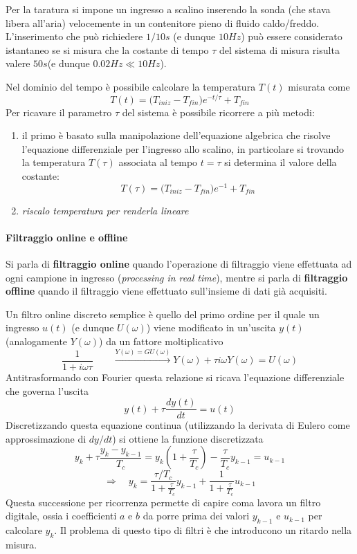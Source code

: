 	Per la taratura si impone un ingresso a scalino inserendo la sonda (che stava libera all'aria) velocemente in un contenitore pieno di fluido caldo/freddo. L'inserimento che può richiedere $1/10s$ (e dunque $10Hz$) può essere considerato istantaneo se si misura che la costante di tempo $\tau$ del sistema di misura risulta valere $50s$(e dunque $0.02Hz \ll 10Hz$).
	
	Nel dominio del tempo è possibile calcolare la temperatura $T(t)$ misurata come
	\[T(t) = \big(T_{iniz} - T_{fin}\big) e^{-t/\tau} + T_{fin} \]
	Per ricavare il parametro $\tau$ del sistema è possibile ricorrere a più metodi:
	\begin{enumerate}
		\item il primo è basato sulla manipolazione dell'equazione algebrica che risolve l'equazione differenziale per l'ingresso allo scalino, in particolare si trovando la temperatura $T(\tau)$ associata al tempo $t=\tau$ si determina il valore della costante:
		\[ T(\tau) = \big(T_{iniz} - T_{fin}\big) e^{-1} + T_{fin} \]
		
		\item \textit{riscalo temperatura per renderla lineare}
	\end{enumerate}

	\paragraph{Filtraggio online e offline} Si parla di \textbf{filtraggio online} quando l'operazione di filtraggio viene effettuata ad ogni campione in ingresso (\textit{processing in real time}), mentre si parla di \textbf{filtraggio offline} quando il filtraggio viene effettuato sull'insieme di dati già acquisiti.
	
	Un filtro online discreto semplice è quello del primo ordine per il quale un ingresso $u(t)$ (e dunque $U(\omega)$) viene modificato in un'uscita $y(t)$ (analogamente $Y(\omega)$) da un fattore moltiplicativo
	\[ \frac 1 {1 + i\omega \tau} \qquad \xrightarrow{Y(\omega) = G U(\omega)} Y(\omega) + \tau i \omega Y(\omega) = U(\omega) \]
	Antitrasformando con Fourier questa relazione si ricava l'equazione differenziale che governa l'uscita
	\[y(t) + \tau \frac{dy(t)}{dt} = u(t)\]
	Discretizzando questa equazione continua (utilizzando la derivata di Eulero come approssimazione di $dy/dt$) si ottiene la funzione discretizzata
	\[ y_k + \tau \frac{y_k - y_{k-1}}{T_c} = y_k \left(1 + \frac \tau {T_c} \right) - \frac \tau {T_c} y_{k-1} = u_{k-1} \]
	\[  \Rightarrow \quad y_k = \frac{\tau / T_c}{1 + \frac{\tau}{T_c}} y_{k-1} + \frac 1  { 1+ \frac \tau {T_c}} u_{k-1} \]
	Questa successione per ricorrenza permette di capire coma lavora un filtro digitale, ossia i coefficienti $a$ e $b$ da porre prima dei valori $y_{k-1}$ e $u_{k-1}$ per calcolare $y_k$. Il problema di questo tipo di filtri è che introducono un ritardo nella misura.
	
